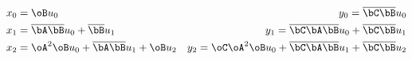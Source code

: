 \begin{align}
x_0 &= \oB u_0 &
y_0 = \overline{\bC \bB} u_0 \\
x_1 &= \overline{\bA \bB} u_0 + \overline{\bB} u_1 &
y_1 = \overline{\bC \bA \bB} u_0 + \overline{\bC \bB} u_1 \\
x_2 &= \oA^2 \oB  u_0 + \overline{\bA \bB} u_1 + \oB u_2 &
y_2 = \oC \oA^2 \oB u_0 +
\overline{\bC \bA \bB} u_1 +
\overline{\bC \bB} u_2 \\
\end{align}